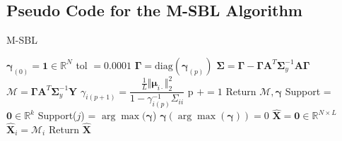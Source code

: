 \subsection{Pseudo Code for the M-SBL Algorithm}
\begin{algorithm}[H]
\caption{M-SBL}
\begin{algorithmic}[1]
\State $\boldsymbol{\gamma}_{(0)} = \mathbf{1} \in \mathbb{R}^N$
\State tol $=0.0001$
	\State $\boldsymbol{\Gamma} = \text{diag}(\boldsymbol{\gamma}_{(p)})$
	\State $\boldsymbol{\Sigma} = \boldsymbol{\Gamma} - \boldsymbol{\Gamma} \mathbf{A}^T \boldsymbol{\Sigma}_y^{-1} \mathbf{A} \boldsymbol{\Gamma}$
	\State $\mathcal{M} = \boldsymbol{\Gamma} \mathbf{A}^T \boldsymbol{\Sigma}_y^{-1} \mathbf{Y}$
		\State $\gamma_{i(p+1)} = \dfrac{\frac{1}{L} \Vert \boldsymbol{\mu}_{i \cdot} \Vert_2^2}{1 - \gamma_{i(p)}^{-1} \Sigma_{ii}}$
	\EndFor
	\State p $+= 1$
\EndWhile
\State Return $\mathcal{M}, \boldsymbol{\gamma}$
\EndProcedure
{}
\State Support = $\mathbf{0} \in \mathbb{R}^{k}$
		\State Support($j$) = $\arg \max (\boldsymbol{\gamma}$)
		\State $\boldsymbol{\gamma}(\arg \max (\boldsymbol{\gamma})) = 0$
	\EndIf
\EndFor
\State $\hat{\mathbf{X}} = \mathbf{0} \in \mathbb{R}^{N \times L}$
	\State $\hat{\mathbf{X}}_i = \mathcal{M}_i$
\EndFor
\State Return $\hat{\mathbf{X}}$
\EndProcedure
\end{algorithmic}
\end{algorithm}

